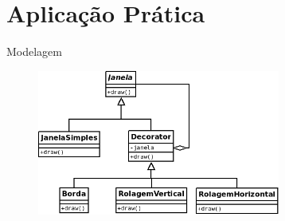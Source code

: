 \section{Aplicação Prática}

\begin{frame}{Modelagem}
\begin{block}{}
  \begin{figure}
    \includegraphics[width=8cm]{figuras/decoratorUML}
  \end{figure}
\end{block}
\end{frame}
